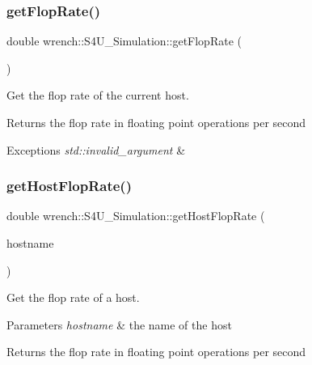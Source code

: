 \subsubsection{\texorpdfstring{get\+Flop\+Rate()}{getFlopRate()}}
{\footnotesize\ttfamily double wrench\+::\+S4\+U\+\_\+\+Simulation\+::get\+Flop\+Rate (\begin{DoxyParamCaption}{ }\end{DoxyParamCaption})\hspace{0.3cm}{\ttfamily [static]}}



Get the flop rate of the current host. 

\begin{DoxyReturn}{Returns}
the flop rate in floating point operations per second
\end{DoxyReturn}

\begin{DoxyExceptions}{Exceptions}
{\em std\+::invalid\+\_\+argument} & \\
\hline
\end{DoxyExceptions}
\mbox{\label{classwrench_1_1_s4_u___simulation_a6ced6004e86834c5f89f553a17d8cb64}} 
\subsubsection{\texorpdfstring{get\+Host\+Flop\+Rate()}{getHostFlopRate()}}
{\footnotesize\ttfamily double wrench\+::\+S4\+U\+\_\+\+Simulation\+::get\+Host\+Flop\+Rate (\begin{DoxyParamCaption}\item[{std\+::string}]{hostname }\end{DoxyParamCaption})\hspace{0.3cm}{\ttfamily [static]}}



Get the flop rate of a host. 


\begin{DoxyParams}{Parameters}
{\em hostname} & the name of the host \\
\hline
\end{DoxyParams}
\begin{DoxyReturn}{Returns}
the flop rate in floating point operations per second
\end{DoxyReturn}

